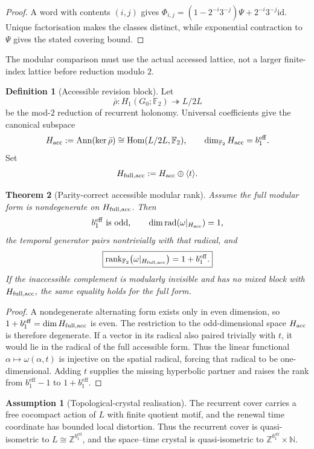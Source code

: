 \documentclass[11pt]{article}
\newtheorem{theorem}{Theorem}[section]
\theoremstyle{definition}
\newtheorem{definition}[theorem]{Definition}
\newtheorem{assumption}{Assumption}[section]
\theoremstyle{remark}
\newcommand{\N}{\mathbb{N}}
\newcommand{\Z}{\mathbb{Z}}
\newcommand{\F}{\mathbb{F}}
\newcommand{\rad}{\operatorname{rad}}
\newcommand{\beff}{b_1^{\mathrm{eff}}}
\newcommand{\Go}{G_0}
\newcommand{\Lat}{L}
\newcommand{\id}{\mathrm{id}}
\newcommand{\rank}{\operatorname{rank}}
\newcommand{\Hom}{\operatorname{Hom}}
\newcommand{\Ann}{\operatorname{Ann}}
\begin{document}
\begin{proof}
A word with contents \((i,j)\) gives
\(\Phi_{i,j}=(1-2^{-i}3^{-j})\Psi+2^{-i}3^{-j}\id\).
Unique factorisation makes the classes distinct, while exponential contraction
to \(\Psi\) gives the stated covering bound.
\end{proof}

The modular comparison must use the actual accessed lattice, not a larger
finite-index lattice before reduction modulo \(2\).

\begin{definition}[Accessible revision block]
\label{def:accessible-revision-block}
Let
\[
 \bar\rho:H_1(\Go;\F_2)\twoheadrightarrow \Lat/2\Lat
\]
be the mod-\(2\) reduction of recurrent holonomy.  Universal coefficients give
the canonical subspace
\[
 H_{\rm acc}:=\Ann(\ker\bar\rho)
 \cong\Hom(\Lat/2\Lat,\F_2),
 \qquad
 \dim_{\F_2}H_{\rm acc}=\beff .
\]
Set
\[
 H_{\rm full,acc}:=H_{\rm acc}\oplus\langle t\rangle .
\]
\end{definition}

\begin{theorem}[Parity-correct accessible modular rank]
\label{thm:accessible-modular-rank}
Assume the full modular form is nondegenerate on \(H_{\rm full,acc}\).  Then
\[
 \beff\ \text{is odd},\qquad
 \dim\rad\!\left(\omega|_{H_{\rm acc}}\right)=1,
\]
the temporal generator pairs nontrivially with that radical, and
\[
 \boxed{\rank_{\F_2}\!\left(\omega|_{H_{\rm full,acc}}\right)=1+\beff.}
\]
If the inaccessible complement is modularly invisible and has no mixed block
with \(H_{\rm full,acc}\), the same equality holds for the full form.
\end{theorem}

\begin{proof}
A nondegenerate alternating form exists only in even dimension, so
\(1+\beff=\dim H_{\rm full,acc}\) is even.  The restriction to the odd-dimensional
space \(H_{\rm acc}\) is therefore degenerate.  If a vector in its radical also
paired trivially with \(t\), it would lie in the radical of the full accessible
form.  Thus the linear functional \(\alpha\mapsto\omega(\alpha,t)\) is injective
on the spatial radical, forcing that radical to be one-dimensional.  Adding
\(t\) supplies the missing hyperbolic partner and raises the rank from
\(\beff-1\) to \(1+\beff\).
\end{proof}

\begin{assumption}[Topological-crystal realisation]
\label{ass:topological-crystal}
The recurrent cover carries a free cocompact action of \(\Lat\) with finite
quotient motif, and the renewal time coordinate has bounded local distortion.
Thus the recurrent cover is quasi-isometric to \(\Lat\cong\Z^{\beff}\), and the
space--time crystal is quasi-isometric to \(\Z^{\beff}\times\N\).
\end{assumption}
\end{document}

